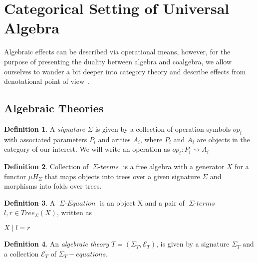 \documentclass[declaration,shortabstract]{iithesis}
\theoremstyle{definition} \newtheorem{definition}{Definition}[chapter]
\theoremstyle{remark} \newtheorem{remark}[definition]{Observation}
\theoremstyle{plain} \newtheorem{theorem}[definition]{Theorem}
\theoremstyle{plain} \newtheorem{lemma}[definition]{Lemma}
\newcommand{\mathVar}[1]{{\operatorname{\mathit{#1}}}}
\begin{document}
\section{Categorical Setting of Universal Algebra}

Algebraic effects can be described via operational means, however,
for the purpose of presenting the duality between algebra and coalgebra,
we allow ourselves to wander a bit deeper into category theory and describe
effects from denotational point of view~\cite{bauer-what-is-algebraic}.

    \subsection{Algebraic Theories}

    \begin{definition}

    A \textit{signature $ \Sigma $} is given by a collection of operation
    symbols $ op_{i} $ with associated parameters $ P_{i} $ and arities $ A_{i} $,
    where $ P_{i} $ and $ A_{i} $ are objects in the category of our interest.
    We will write an operation as $ op_{i} : P_{i} \rightsquigarrow A_{i} $

    \end{definition}

    \begin{definition}
    Collection of $\mathVar{\Sigma-terms}$ is a free algebra with a generator $X$
    for a functor $ \mu H_{\Sigma} $ that maps objects into trees over a given
    signature $ \Sigma $ and morphisms into folds over trees.

    \end{definition}

    \begin{definition}

        A $ \mathVar{\Sigma-Equation} $ is an object X and a pair of
        $\mathVar{\Sigma-terms}$ $l, r \in Tree_{\Sigma}(X)$, written as

        \begin{center}
        $ X \mid l = r $
        \end{center}

    \end{definition}

    \begin{definition}

    An \textit{algebraic theory} $T = (\Sigma_{T}, \mathcal{E}_{T})$, is given
    by a signature $\Sigma_{T}$ and a collection $\mathcal{E}_{T}$ of
    $\mathVar{\Sigma_{T}-equations}$.

    \end{definition}
\end{document}

